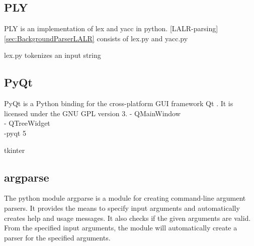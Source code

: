 \subsection{PLY}\label{sec:BackgroundPythonPLY}

\acf{PLY} \cite{PLY} is an implementation of lex and yacc in python.
[LALR-parsing] \ref{sec:BackgroundParserLALR}
consists of lex.py and yacc.py

lex.py tokenizes an input string

\subsection{PyQt}\label{sec:BackgroundPytonPyQt}

PyQt is a Python binding for the cross-platform GUI framework Qt \cite{PyQt}.
It is licensed under the GNU GPL version 3.
- QMainWindow \\
- QTreeWidget \\
-pyqt 5

tkinter

\subsection{argparse}\label{sec:BackgroundArgparse}

The python module argparse \cite{argparse} is a module for creating command-line argument parsers.
It provides the means to specify input arguments and automatically creates help and usage messages.
It also checks if the given arguments are valid.
From the specified input arguments, the module will automatically create a parser for the specified arguments.